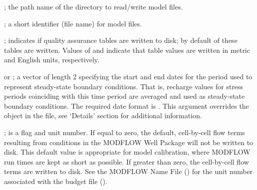 \documentclass[a4paper]{book}
\begin{document}
\begin{Arguments}
\begin{ldescription}
\item[\code{dir.run}] ; the path name of the directory to read/write model files.
\item[\code{id}] ; a short identifier (file name) for model files.
\item[\code{qa.tables}] ; indicates if quality assurance tables are written to disk; by default  of these tables are written.
Values of  and  indicate that table values are written in metric and English units, respectively.
\item[\code{ss.interval}]  or ; a vector of length 2 specifying the start and end dates for the period used to represent steady-state boundary conditions.
That is, recharge values for stress periods coinciding with this time period are averaged and used as steady-state boundary conditions.
The required date format is .
This argument overrides the  object in the  file, see `Details' section for additional information.
\item[\code{iwelcb}] ; is a flag and unit number.
If equal to zero, the default, cell-by-cell flow terms resulting from conditions in the MODFLOW Well Package will not be written to disk.
This default value is appropriate for model calibration, where MODFLOW run times are kept as short as possible.
If greater than zero, the cell-by-cell flow terms are written to disk.
See the MODFLOW Name File () for the unit number associated with the budget file ().

\end{ldescription}
\end{Arguments}
%
\end{document}
